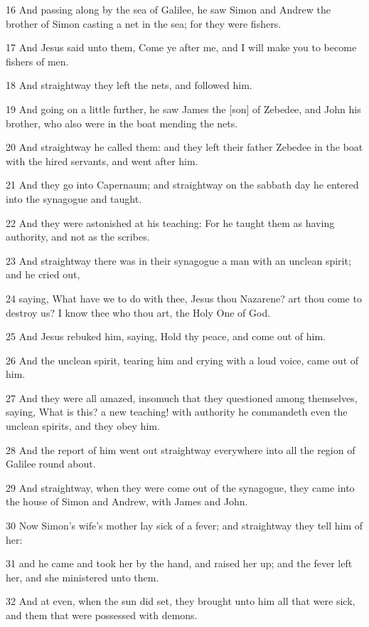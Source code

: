 \par 16 And passing along by the sea of Galilee, he saw Simon and Andrew the brother of Simon casting a net in the sea; for they were fishers.
\par 17 And Jesus said unto them, Come ye after me, and I will make you to become fishers of men.
\par 18 And straightway they left the nets, and followed him.
\par 19 And going on a little further, he saw James the [son] of Zebedee, and John his brother, who also were in the boat mending the nets.
\par 20 And straightway he called them: and they left their father Zebedee in the boat with the hired servants, and went after him.
\par 21 And they go into Capernaum; and straightway on the sabbath day he entered into the synagogue and taught.
\par 22 And they were astonished at his teaching: For he taught them as having authority, and not as the scribes.
\par 23 And straightway there was in their synagogue a man with an unclean spirit; and he cried out,
\par 24 saying, What have we to do with thee, Jesus thou Nazarene? art thou come to destroy us? I know thee who thou art, the Holy One of God.
\par 25 And Jesus rebuked him, saying, Hold thy peace, and come out of him.
\par 26 And the unclean spirit, tearing him and crying with a loud voice, came out of him.
\par 27 And they were all amazed, insomuch that they questioned among themselves, saying, What is this? a new teaching! with authority he commandeth even the unclean spirits, and they obey him.
\par 28 And the report of him went out straightway everywhere into all the region of Galilee round about.
\par 29 And straightway, when they were come out of the synagogue, they came into the house of Simon and Andrew, with James and John.
\par 30 Now Simon's wife's mother lay sick of a fever; and straightway they tell him of her:
\par 31 and he came and took her by the hand, and raised her up; and the fever left her, and she ministered unto them.
\par 32 And at even, when the sun did set, they brought unto him all that were sick, and them that were possessed with demons.
